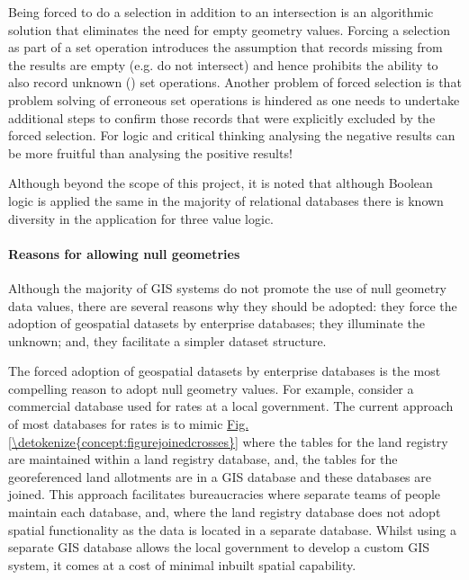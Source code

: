 \documentclass[letterpaper,11pt,english]{sphinxmanual}
\begin{document}
Being forced to do a selection in addition to an intersection is an algorithmic solution that eliminates the need for empty geometry values.  Forcing a selection as part of a set operation introduces the assumption that records missing from the results are empty (e.g. do not intersect) and hence prohibits the ability to also record unknown () set operations.  Another problem of forced selection is that problem solving of erroneous set operations is hindered as one needs to undertake additional steps to confirm those records that were explicitly excluded by the forced selection.  For logic and critical thinking analysing the negative results can be more fruitful than analysing the positive results!

Although beyond the scope of this project, it is noted that although Boolean logic is applied the same in the majority of relational databases there is known diversity in the application for three value logic.


\paragraph{Reasons for allowing null geometries}
\label{\detokenize{concept:reasons-for-allowing-null-geometries}}
Although the majority of GIS systems do not promote the use of null geometry data values, there are several reasons why they should be adopted: they force the adoption of geospatial datasets by enterprise databases; they illuminate the unknown; and, they facilitate a simpler dataset structure.

The forced adoption of geospatial datasets by enterprise databases is the most compelling reason to adopt null geometry values.  For example, consider a commercial database used for rates at a local government.  The current approach of most databases for rates is to mimic \hyperref[\detokenize{concept:figurejoinedcrosses}]{Fig.\@ \ref{\detokenize{concept:figurejoinedcrosses}}} where the tables for the land registry are maintained within a land registry database, and, the tables for the georeferenced land allotments are in a GIS database and these databases are joined.  This approach facilitates bureaucracies where separate teams of people maintain each database, and, where the land registry database does not adopt spatial functionality as the data is located in a separate database.  Whilst using a separate GIS database allows the local government to develop a custom GIS system, it comes at a cost of minimal inbuilt spatial capability.
\end{document}
